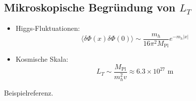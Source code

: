 \documentclass{article}
\newcommand{\Mpl}{M_{\text{Pl}}}
\begin{document}
	\subsection{Mikroskopische Begründung von \(L_T\)}
	\begin{itemize}
		\item Higgs-Fluktuationen:
		\begin{equation}
			\langle \delta\Phi(x) \delta\Phi(0) \rangle \sim \frac{m_h}{16\pi^2 \Mpl} e^{-m_h |x|}
		\end{equation}
		\item Kosmische Skala:
		\begin{equation}
			L_T \sim \frac{\Mpl}{m_h^2 v} \approx 6.3 \times 10^{27} \text{ m}
		\end{equation}
	\end{itemize}
	
	\begin{thebibliography}{9}
		 Beispielreferenz.
	\end{thebibliography}
	
\end{document}
